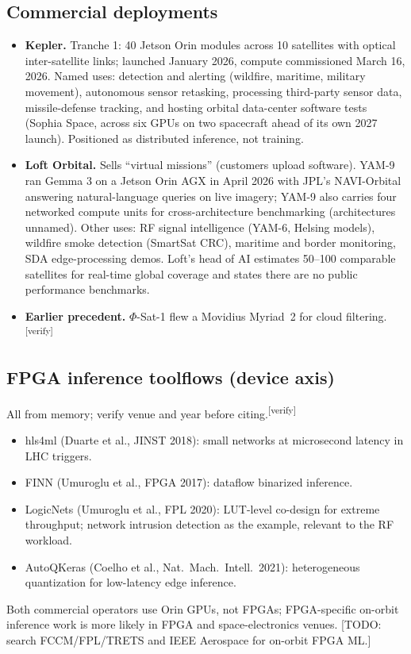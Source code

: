 \documentclass[11pt]{article}
\newcommand{\verify}{\textsuperscript{\textcolor{red!70!black}{[verify]}}}
\newcommand{\todo}[1]{\textcolor{blue!60!black}{[TODO: #1]}}
\begin{document}
\subsection{Commercial deployments}
\begin{itemize}
  \item \textbf{Kepler.} Tranche 1: 40 Jetson Orin modules across 10 satellites with optical
        inter-satellite links; launched January 2026, compute commissioned March 16, 2026. Named uses:
        detection and alerting (wildfire, maritime, military movement), autonomous sensor retasking,
        processing third-party sensor data, missile-defense tracking, and hosting orbital data-center
        software tests (Sophia Space, across six GPUs on two spacecraft ahead of its own 2027 launch).
        Positioned as distributed inference, not training.
  \item \textbf{Loft Orbital.} Sells ``virtual missions'' (customers upload software). YAM-9 ran Gemma 3
        on a Jetson Orin AGX in April 2026 with JPL's NAVI-Orbital answering natural-language queries on
        live imagery; YAM-9 also carries four networked compute units for cross-architecture
        benchmarking (architectures unnamed). Other uses: RF signal intelligence (YAM-6, Helsing models),
        wildfire smoke detection (SmartSat CRC), maritime and border monitoring, SDA edge-processing
        demos. Loft's head of AI estimates 50--100 comparable satellites for real-time global coverage
        and states there are no public performance benchmarks.
  \item \textbf{Earlier precedent.} $\Phi$-Sat-1 flew a Movidius Myriad~2 for cloud filtering.\verify
\end{itemize}

\subsection{FPGA inference toolflows (device axis)}
All from memory; verify venue and year before citing.\verify
\begin{itemize}
  \item hls4ml (Duarte et al., JINST 2018): small networks at microsecond latency in LHC triggers.
  \item FINN (Umuroglu et al., FPGA 2017): dataflow binarized inference.
  \item LogicNets (Umuroglu et al., FPL 2020): LUT-level co-design for extreme throughput; network
        intrusion detection as the example, relevant to the RF workload.
  \item AutoQKeras (Coelho et al., Nat.\ Mach.\ Intell.\ 2021): heterogeneous quantization for
        low-latency edge inference.
\end{itemize}
Both commercial operators use Orin GPUs, not FPGAs; FPGA-specific on-orbit inference work is more likely in
FPGA and space-electronics venues. \todo{search FCCM/FPL/TRETS and IEEE Aerospace for on-orbit FPGA ML.}
\end{document}
